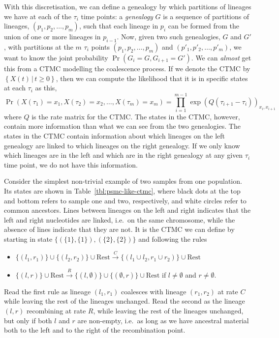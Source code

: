 \documentclass[graybox]{svmult}
\begin{document}
With this discretisation, we can define a genealogy by which partitions of lineages we have at each of the $\tau_i$ time points: a \emph{genealogy} $G$ is a sequence of partitions of lineages, $(p_1,p_2,\ldots,p_m)$, such that each lineage in $p_i$ can be formed from the union of one or more lineages in $p_{i-1}$. Now, given two such genealogies, $G$ and $G'$, with partitions at the $m$ $\tau_i$ points $(p_1,p_2,\ldots,p_m)$ and $(p'_1,p'_2,\ldots,p'_m)$, we want to know the joint probability $\Pr(G_i=G,G_{i+1}=G')$. We can \emph{almost} get this from a CTMC modelling the coalescence process. If we denote the CTMC by $\left\{ X(t) \,|\, t\geq 0 \right\}$, then we can compute the likelihood that it is in specific states at each $\tau_i$ as this,
\begin{equation}
	\Pr(X(\tau_1)=x_1,X(\tau_2)=x_2,\ldots,X(\tau_m)=x_m) =
	\prod_{i=1}^{m-1} \exp\left(Q\left(\tau_{i+1}-\tau_i\right)\right)_{x_i,x_{i+1}}
\end{equation}
where $Q$ is the rate matrix for the CTMC. The states in the CTMC, however, contain more information than what we can see from the two genealogies. The states in the CTMC contain information about which lineages on the left genealogy are linked to which lineages on the right genealogy. If we only know which lineages are in the left and which are in the right genealogy at any given $\tau_i$ time point, we do not have this information.

Consider the simplest non-trivial example of two samples from one population. Its states are shown in Table~\ref{tbl:psmc-like-ctmc}, where black dots at the top and bottom refers to sample one and two, respectively, and white circles refer to common ancestors. Lines between lineages on the left and right indicates that the left and right nucleotides are linked, i.e.\ on the same chromosome, while the absence of lines indicate that they are not. It is the CTMC we can define by starting in state $\{(\{1\},\{1\}),(\{2\},\{2\})\}$ and following the rules
\begin{itemize}
	\item $\{(l_1,r_1)\}\cup\{(l_2,r_2)\}\cup\text{Rest} \overset{C}{\to}\{(l_1\cup l_2,r_1 \cup r_2)\}\cup\text{Rest}$ 
	\item $\{(l,r)\}\cup\text{Rest} \overset{R}{\to} \{(l,\emptyset)\}\cup\{(\emptyset,r)\}\cup\text{Rest}$ if $l\neq\emptyset$ and $r\neq\emptyset$.
\end{itemize}
Read the first rule as lineage $(l_1,r_1)$ coalesces with lineage $(r_1,r_2)$ at rate $C$ while leaving the rest of the lineages unchanged. Read the second as the lineage $(l,r)$ recombining at rate $R$, while leaving the rest of the lineages unchanged, but only if both $l$ and $r$ are non-empty, i.e.\ as long as we have ancestral material both to the left and to the right of the recombination point.
\end{document}
